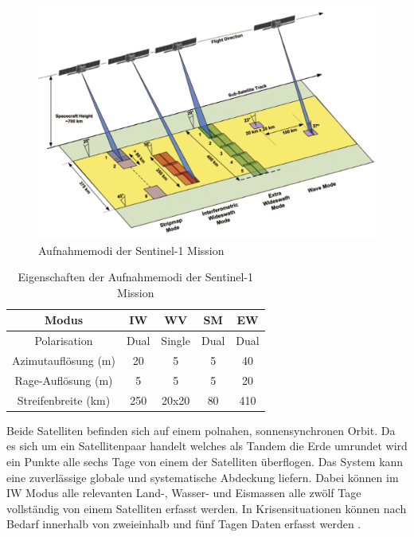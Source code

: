 \begin{figure}[H]
    \centering
    \includegraphics[width=\textwidth]{Bilder/Aquisition_Modes.png}
    \caption{Aufnahmemodi der Sentinel-1 Mission \cite{sentinel_1_overview}}
    \label{sar_modi_sentinel_1}
\end{figure}

\begin{center}
\begin{table}[H]
    \caption{Eigenschaften der Aufnahmemodi der Sentinel-1 Mission \cite{sentinel_1_overview}}
    \centering
    \begin{tabular}{c|c c c c } 
        Modus & IW & WV & SM & EW \\ 
        \hline
        Polarisation & Dual & Single & Dual & Dual \\ 
        Azimutauflösung (m) & 20 & 5 & 5 & 40 \\
        Rage-Auflösung (m) & 5 & 5 & 5 & 20 \\
        Streifenbreite (km) & 250 & 20x20 & 80 & 410\\
    \end{tabular}
    \label{aufnahmemodi_sentinel_1}
\end{table}
\end{center}

Beide Satelliten befinden sich auf einem polnahen, sonnensynchronen Orbit. 
Da es sich um ein Satellitenpaar handelt welches als Tandem die Erde umrundet wird ein Punkte alle sechs Tage von einem der Satelliten überflogen. Das System kann eine zuverlässige globale und systematische
Abdeckung liefern. Dabei können im IW Modus alle relevanten Land-, Wasser- und Eismassen alle zwölf Tage vollständig von einem Satelliten erfasst werden. 
In Krisensituationen können nach Bedarf innerhalb von zweieinhalb und fünf Tagen Daten erfasst werden \cite{sentinel_1_overview}. 


